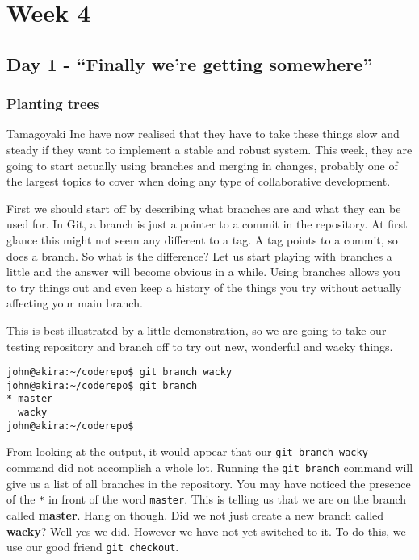 \cleardoublepage
\chapter{Week 4}
\section{Day 1 - ``Finally we're getting somewhere''}
\subsection{Planting trees}

Tamagoyaki Inc have now realised that they have to take these things slow and steady if they want to implement a stable and robust system.  This week, they are going to start actually using branches and merging in changes, probably one of the largest topics to cover when doing any type of collaborative development.  

First we should start off by describing what branches are and what they can be used for.  In Git, a branch is just a pointer to a commit in the repository.  At first glance this might not seem any different to a tag.  A tag points to a commit, so does a branch.  So what is the difference?  Let us start playing with branches a little and the answer will become obvious in a while.  Using branches allows you to try things out and even keep a history of the things you try without actually affecting your main branch.

This is best illustrated by a little demonstration, so we are going to take our testing repository and branch off to try out new, wonderful and wacky things.

\begin{Verbatim}[frame=leftline,framerule=1mm,fontsize=\relsize{-3}] 
john@akira:~/coderepo$ git branch wacky
john@akira:~/coderepo$ git branch
* master
  wacky
john@akira:~/coderepo$ 
\end{Verbatim}

From looking at the output, it would appear that our \texttt{git branch wacky} command did not accomplish a whole lot.  Running the \texttt{git branch} command will give us a list of all branches in the repository.  You may have noticed the presence of the \texttt{*} in front of the word \texttt{master}.  This is telling us that we are on the branch called \textbf{master}.  Hang on though.  Did we not just create a new branch called \textbf{wacky}?  Well yes we did.  However we have not yet switched to it.  To do this, we use our good friend \texttt{git checkout}.

